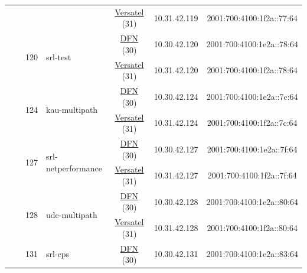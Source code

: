 \begin{small}
\begin{center}
\begin{longtable}{|c|c|c|c|c|c|c|c|}
  &  &  &  & \multicolumn{2}{|c|}{\tiny{\href{http://www.versatel.de}{Versatel} (31)}} & \tiny{10.31.42.119} & \tiny{2001:700:4100:1f2a::77:64} \\* \cline{3-3}\cline{4-4}\cline{5-5}\cline{6-6}\cline{7-7}\cline{8-8}
  &  & \multirow{2}{*}{\tiny{120}} & \multicolumn{1}{|l|}{\multirow{2}{*}{\tiny{srl-test}}} & \multicolumn{2}{|c|}{\tiny{\href{https://www.dfn.de}{DFN} (30)}} & \tiny{10.30.42.120} & \tiny{2001:700:4100:1e2a::78:64} \\* \cline{5-5}\cline{6-6}\cline{7-7}\cline{8-8}
  &  &  &  & \multicolumn{2}{|c|}{\tiny{\href{http://www.versatel.de}{Versatel} (31)}} & \tiny{10.31.42.120} & \tiny{2001:700:4100:1f2a::78:64} \\* \cline{3-3}\cline{4-4}\cline{5-5}\cline{6-6}\cline{7-7}\cline{8-8}
  &  & \multirow{2}{*}{\tiny{124}} & \multicolumn{1}{|l|}{\multirow{2}{*}{\tiny{kau-multipath}}} & \multicolumn{2}{|c|}{\tiny{\href{https://www.dfn.de}{DFN} (30)}} & \tiny{10.30.42.124} & \tiny{2001:700:4100:1e2a::7c:64} \\* \cline{5-5}\cline{6-6}\cline{7-7}\cline{8-8}
  &  &  &  & \multicolumn{2}{|c|}{\tiny{\href{http://www.versatel.de}{Versatel} (31)}} & \tiny{10.31.42.124} & \tiny{2001:700:4100:1f2a::7c:64} \\* \cline{3-3}\cline{4-4}\cline{5-5}\cline{6-6}\cline{7-7}\cline{8-8}
  &  & \multirow{2}{*}{\tiny{127}} & \multicolumn{1}{|l|}{\multirow{2}{*}{\tiny{srl-netperformance}}} & \multicolumn{2}{|c|}{\tiny{\href{https://www.dfn.de}{DFN} (30)}} & \tiny{10.30.42.127} & \tiny{2001:700:4100:1e2a::7f:64} \\* \cline{5-5}\cline{6-6}\cline{7-7}\cline{8-8}
  &  &  &  & \multicolumn{2}{|c|}{\tiny{\href{http://www.versatel.de}{Versatel} (31)}} & \tiny{10.31.42.127} & \tiny{2001:700:4100:1f2a::7f:64} \\* \cline{3-3}\cline{4-4}\cline{5-5}\cline{6-6}\cline{7-7}\cline{8-8}
  &  & \multirow{2}{*}{\tiny{128}} & \multicolumn{1}{|l|}{\multirow{2}{*}{\tiny{ude-multipath}}} & \multicolumn{2}{|c|}{\tiny{\href{https://www.dfn.de}{DFN} (30)}} & \tiny{10.30.42.128} & \tiny{2001:700:4100:1e2a::80:64} \\* \cline{5-5}\cline{6-6}\cline{7-7}\cline{8-8}
  &  &  &  & \multicolumn{2}{|c|}{\tiny{\href{http://www.versatel.de}{Versatel} (31)}} & \tiny{10.31.42.128} & \tiny{2001:700:4100:1f2a::80:64} \\* \cline{3-3}\cline{4-4}\cline{5-5}\cline{6-6}\cline{7-7}\cline{8-8}
  &  & \multirow{2}{*}{\tiny{131}} & \multicolumn{1}{|l|}{\multirow{2}{*}{\tiny{srl-cps}}} & \multicolumn{2}{|c|}{\tiny{\href{https://www.dfn.de}{DFN} (30)}} & \tiny{10.30.42.131} & \tiny{2001:700:4100:1e2a::83:64} \\* \cline{5-5}\cline{6-6}\cline{7-7}\cline{8-8}

\end{longtable}
\end{center}
\end{small}
